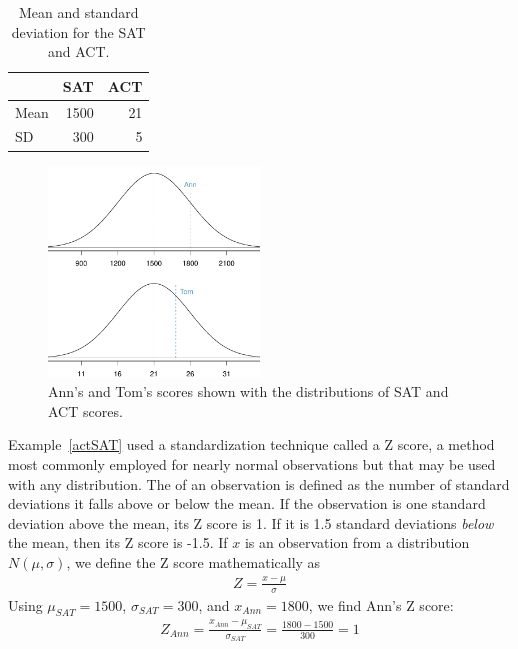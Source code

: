 \begin{table}[ht]
\centering
\begin{tabular}{l r r}
  \hline
  & SAT & ACT \\
  \hline
Mean \hspace{0.3cm} & 1500 & 21 \\
SD & 300 & 5 \\
   \hline
\end{tabular}
\caption{Mean and standard deviation for the SAT and ACT.}
\label{satACTstats}
\end{table}

\begin{figure}[ht]
\centering
\includegraphics[width=0.5\textwidth]{02/figures/satActNormals/satActNormals}
\caption{Ann's and Tom's scores shown with the distributions of SAT and ACT scores.}
\label{satActNormals}
\end{figure}

\textA{\pagebreak}

Example~\ref{actSAT} used a standardization technique called a Z score, a method most commonly employed for nearly normal observations but that may be used with any distribution. The  of an observation is defined as the number of standard deviations it falls above or below the mean. If the observation is one standard deviation above the mean, its Z score is 1. If it is 1.5 standard deviations \emph{below} the mean, then its Z score is -1.5. If $x$ is an observation from a distribution $N(\mu, \sigma)$, we define the Z score mathematically as
\begin{eqnarray*}
Z = \frac{x-\mu}{\sigma}
\end{eqnarray*}
Using $\mu_{SAT}=1500$, $\sigma_{SAT}=300$, and $x_{Ann}=1800$, we find Ann's Z score:
\begin{eqnarray*}
Z_{Ann} = \frac{x_{Ann} - \mu_{SAT}}{\sigma_{SAT}} = \frac{1800-1500}{300} = 1
\end{eqnarray*}

